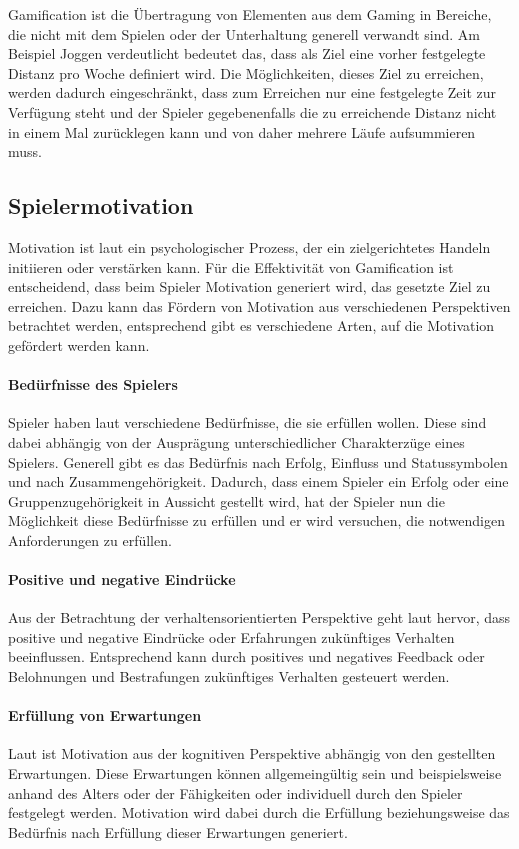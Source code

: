 \documentclass[
	oneside,  %
	ngerman, 
	final, 
	11pt, 
	a4paper, 
	1.1headlines, 
	headinclude=false, 
	footinclude=false, 
	mpinclude=false, 
	pagesize, 
	onecolumn, 
	titlepage, 
	parskip=half, 
	headsepline, 
	chapterprefix=false, 
	version=first, 
	listof=totoc, 
	bibliography=totoc, 
	toc=graduated, 
	fleqn
]{scrbook}
\begin{document}
Gamification ist die Übertragung von Elementen aus dem Gaming in Bereiche, die nicht mit dem Spielen oder der Unterhaltung generell verwandt sind.
Am Beispiel Joggen verdeutlicht bedeutet das, dass als Ziel eine vorher festgelegte Distanz pro Woche definiert wird.
Die Möglichkeiten, dieses Ziel zu erreichen, werden dadurch eingeschränkt, dass zum Erreichen nur eine festgelegte Zeit zur Verfügung steht und der Spieler gegebenenfalls die zu erreichende Distanz nicht in einem Mal zurücklegen kann und von daher mehrere Läufe aufsummieren muss.

\subsection{Spielermotivation}
\label{Spielermotivation}
Motivation ist laut \cite{SH2014} ein psychologischer Prozess, der ein zielgerichtetes Handeln initiieren oder verstärken kann.
Für die Effektivität von Gamification ist entscheidend, dass beim Spieler Motivation generiert wird, das gesetzte Ziel zu erreichen.
Dazu kann das Fördern von Motivation aus verschiedenen Perspektiven betrachtet werden, entsprechend gibt es verschiedene Arten, auf die Motivation gefördert werden kann.

\paragraph{Bedürfnisse des Spielers}
Spieler haben laut \cite{SH2014} verschiedene Bedürfnisse, die sie erfüllen wollen.
Diese sind dabei abhängig von der Ausprägung unterschiedlicher Charakterzüge eines Spielers.
Generell gibt es das Bedürfnis nach Erfolg, Einfluss und Statussymbolen und nach Zusammengehörigkeit.
Dadurch, dass einem Spieler ein Erfolg oder eine Gruppenzugehörigkeit in Aussicht gestellt wird, hat der Spieler nun die Möglichkeit diese Bedürfnisse zu erfüllen und er wird versuchen, die notwendigen Anforderungen zu erfüllen.

\paragraph{Positive und negative Eindrücke}
Aus der Betrachtung der verhaltensorientierten Perspektive geht laut \cite{SH2014} hervor, dass positive und negative Eindrücke oder Erfahrungen zukünftiges Verhalten beeinflussen.
Entsprechend kann durch positives und negatives Feedback oder Belohnungen und Bestrafungen zukünftiges Verhalten gesteuert werden.

\paragraph{Erfüllung von Erwartungen}
Laut \cite{SH2014} ist Motivation aus der kognitiven Perspektive abhängig von den gestellten Erwartungen.
Diese Erwartungen können allgemeingültig sein und beispielsweise anhand des Alters oder der Fähigkeiten oder individuell durch den Spieler festgelegt werden.
Motivation wird dabei durch die Erfüllung beziehungsweise das Bedürfnis nach Erfüllung dieser Erwartungen generiert.
\end{document}
